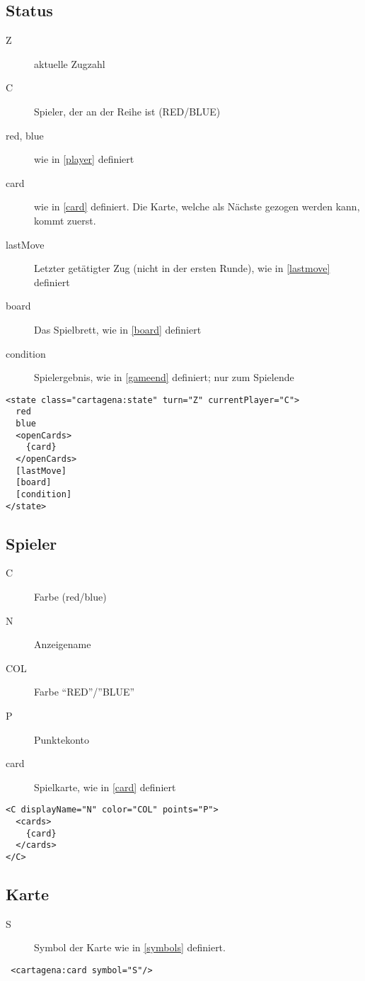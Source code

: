 \documentclass[12pt,a4paper, ngerman, oneside]{scrartcl}
\begin{document}
\subsection{\label{state}Status}
\begin{description}
\item[Z] aktuelle Zugzahl
\item[C] Spieler, der an der Reihe ist (RED/BLUE)
\item[red, blue] wie in \ref{player} definiert
\item[card] wie in \ref{card} definiert. Die Karte, welche als Nächste gezogen
werden kann, kommt zuerst.
\item[lastMove] Letzter getätigter Zug (nicht in der ersten Runde), wie in
\ref{lastmove} definiert
\item[board] Das Spielbrett, wie in \ref{board} definiert
\item[condition] Spielergebnis, wie in \ref{gameend} definiert; nur zum Spielende
\end{description}
\begin{verbatim}
<state class="cartagena:state" turn="Z" currentPlayer="C">
  red
  blue
  <openCards>
    {card}
  </openCards>
  [lastMove]
  [board]
  [condition]
</state>

\end{verbatim}

\subsection{\label{player}Spieler}
\begin{description}
\item[C] Farbe (red/blue)
\item[N] Anzeigename
\item[COL] Farbe ``RED''/''BLUE''
\item[P] Punktekonto
\item[card] Spielkarte, wie in \ref{card} definiert
\end{description}
\begin{verbatim}
<C displayName="N" color="COL" points="P">
  <cards>
    {card}
  </cards>
</C>
\end{verbatim}


\subsection{\label{card}Karte}
\begin{description}
\item[S] Symbol der Karte wie in \ref{symbols} definiert.
\end{description}
\begin{verbatim} <cartagena:card symbol="S"/>
\end{verbatim}
\end{document}
